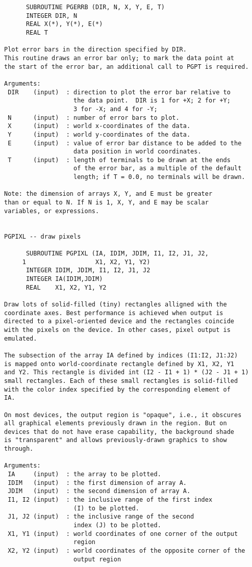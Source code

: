 \begin{small}
\begin{verbatim}
      SUBROUTINE PGERRB (DIR, N, X, Y, E, T)
      INTEGER DIR, N
      REAL X(*), Y(*), E(*)
      REAL T
 
Plot error bars in the direction specified by DIR.
This routine draws an error bar only; to mark the data point at
the start of the error bar, an additional call to PGPT is required.
 
Arguments:
 DIR    (input)  : direction to plot the error bar relative to
                   the data point.  DIR is 1 for +X; 2 for +Y;
                   3 for -X; and 4 for -Y;
 N      (input)  : number of error bars to plot.
 X      (input)  : world x-coordinates of the data.
 Y      (input)  : world y-coordinates of the data.
 E      (input)  : value of error bar distance to be added to the
                   data position in world coordinates.
 T      (input)  : length of terminals to be drawn at the ends
                   of the error bar, as a multiple of the default
                   length; if T = 0.0, no terminals will be drawn.
 
Note: the dimension of arrays X, Y, and E must be greater
than or equal to N. If N is 1, X, Y, and E may be scalar
variables, or expressions.

 
PGPIXL -- draw pixels

      SUBROUTINE PGPIXL (IA, IDIM, JDIM, I1, I2, J1, J2, 
     1                   X1, X2, Y1, Y2)
      INTEGER IDIM, JDIM, I1, I2, J1, J2
      INTEGER IA(IDIM,JDIM)
      REAL    X1, X2, Y1, Y2

Draw lots of solid-filled (tiny) rectangles alligned with the
coordinate axes. Best performance is achieved when output is
directed to a pixel-oriented device and the rectangles coincide
with the pixels on the device. In other cases, pixel output is
emulated.

The subsection of the array IA defined by indices (I1:I2, J1:J2)
is mapped onto world-coordinate rectangle defined by X1, X2, Y1
and Y2. This rectangle is divided int (I2 - I1 + 1) * (J2 - J1 + 1)
small rectangles. Each of these small rectangles is solid-filled
with the color index specified by the corresponding element of 
IA.

On most devices, the output region is "opaque", i.e., it obscures
all graphical elements previously drawn in the region. But on
devices that do not have erase capability, the background shade
is "transparent" and allows previously-drawn graphics to show
through.

Arguments:
 IA     (input)  : the array to be plotted.
 IDIM   (input)  : the first dimension of array A.
 JDIM   (input)  : the second dimension of array A.
 I1, I2 (input)  : the inclusive range of the first index
                   (I) to be plotted.
 J1, J2 (input)  : the inclusive range of the second
                   index (J) to be plotted.
 X1, Y1 (input)  : world coordinates of one corner of the output
                   region
 X2, Y2 (input)  : world coordinates of the opposite corner of the
                   output region



\end{verbatim}
\end{small}
